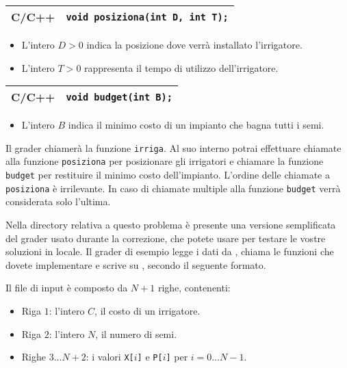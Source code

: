 \begin{center}\begin{tabularx}{\textwidth}{|c|X|}
\hline
C/C++  & \verb|void posiziona(int D, int T);|\\
\hline
\end{tabularx}\end{center}

\begin{itemize}[nolistsep]
  \item L'intero $D > 0$ indica la posizione dove verrà installato l'irrigatore.
  \item L'intero $T > 0$ rappresenta il tempo di utilizzo dell'irrigatore.
\end{itemize}

\medskip

\begin{center}\begin{tabularx}{\textwidth}{|c|X|}
\hline
C/C++  & \verb|void budget(int B);|\\
\hline
\end{tabularx}\end{center}

\begin{itemize}[nolistsep]
  \item L'intero $B$ indica il minimo costo di un impianto che bagna tutti i
  semi.
\end{itemize}

\medskip

Il grader chiamerà la funzione \texttt{irriga}. Al suo interno potrai effettuare
chiamate alla funzione \verb|posiziona| per posizionare gli irrigatori e
chiamare la funzione \verb|budget| per restituire il minimo costo dell'impianto.
L'ordine delle chiamate a \verb|posiziona| è irrilevante. In caso di chiamate
multiple alla funzione \verb|budget| verrà considerata solo l'ultima.


\Grader

Nella directory relativa a questo problema è presente una versione semplificata
del grader usato durante la correzione, che potete usare per testare le vostre
soluzioni in locale. Il grader di esempio legge i dati da , chiama
le funzioni che dovete implementare e scrive su \outputfile{}, secondo il
seguente formato.

Il file di input è composto da $N+1$ righe, contenenti:
\begin{itemize}[nolistsep,itemsep=2mm]
\item Riga $1$: l'intero $C$, il costo di un irrigatore.
\item Riga $2$: l'intero $N$, il numero di semi.
\item Righe $3\ldots N+2$: i valori \texttt{X[$i$]} e \texttt{P[$i$]} per $i = 0\ldots N-1$.
\end{itemize}

